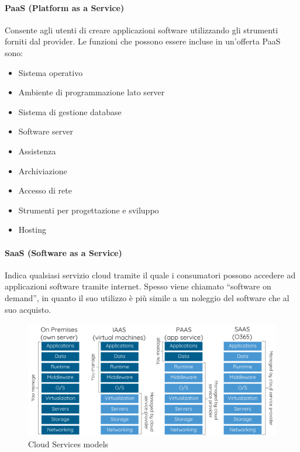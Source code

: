 \documentclass[10pt,a4paper,oneside]{scrbook}
\begin{document}
\paragraph{PaaS (Platform as a Service)}
Consente agli utenti di creare applicazioni software utilizzando gli strumenti forniti dal provider.
Le funzioni che possono essere incluse in un'offerta PaaS sono:
\begin{itemize}
    \item Sistema operativo
    \item Ambiente di programmazione lato server
    \item Sistema di gestione database
    \item Software server
    \item Assistenza
    \item Archiviazione
    \item Accesso di rete
    \item Strumenti per progettazione e sviluppo 
    \item Hosting
\end{itemize}

\paragraph{SaaS (Software as a Service)}
Indica qualsiasi servizio cloud tramite il quale i consumatori possono accedere ad applicazioni software tramite internet.
Spesso viene chiamato ``software on demand'', in quanto il suo utilizzo è più simile a un noleggio del software che al suo acquisto.
\begin{figure}[h]
    \centering
    \includegraphics[width=1\linewidth]{img/Cloud-service.png}
    \caption{Cloud Services models}
    \label{fig:Cloud Services models}
\end{figure}
\end{document}
